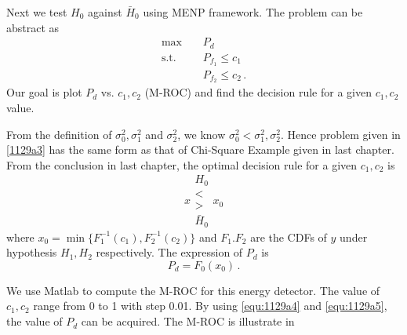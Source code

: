 Next we test $H_0$ against $\bar{H}_0$ using MENP framework. The problem can be abstract as
\begin{equation}
  \begin{split}
	\max\;\;\;\;&P_d\\
	\text{s.t.}\;\;\;\;&P_{f_1}\leq c_1\\
	&P_{f_2} \leq c_2\,.
  \end{split}
  \label{1129a3}
\end{equation}
Our goal is plot $P_d$ vs. $c_1, c_2$ (M-ROC) and find the decision rule for a given $c_1, c_2$ value.

From the definition of $\sigma_0^2, \sigma_1^2$ and $\sigma_2^2$, we know $\sigma_0^2 < \sigma_1^2, \sigma_2^2$. Hence  problem given in \eqref{1129a3} has the same form as that of Chi-Square Example given in last chapter. From the conclusion in last chapter, the optimal  decision rule for a given $c_1, c_2$ is 
\begin{equation}
  x \substack{H_0 \\ < \\ > \\ \bar{H}_0} x_0
  \label{equ:1129a4}
\end{equation}
where $x_0 = \min\{F_1^{-1}(c_1),  F_2^{-1}(c_2)\}$ and $F_1. F_2$ are the CDFs of $y$ under hypothesis $H_1, H_2$ respectively. The expression of $P_d$ is 
\begin{equation}
  P_d = F_0(x_0)\,.
  \label{equ:1129a5}
\end{equation}

We use Matlab to compute the M-ROC for this energy detector. The value of $c_1, c_2$ range from 0 to 1 with step 0.01. By using \eqref{equ:1129a4} and \eqref{equ:1129a5}, the value of $P_d$ can be acquired. The M-ROC is illustrate in 
